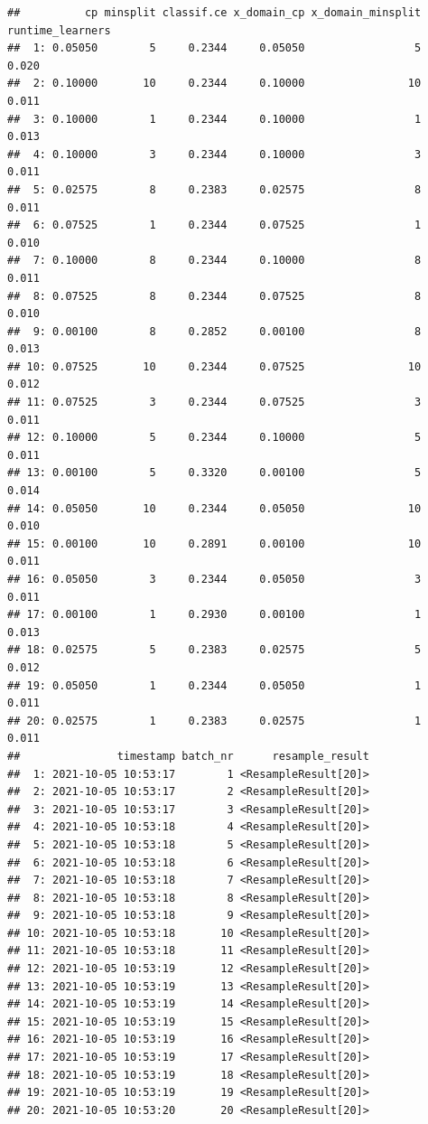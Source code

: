 \documentclass[
]{scrbook}
\begin{document}
\begin{verbatim}
##          cp minsplit classif.ce x_domain_cp x_domain_minsplit runtime_learners
##  1: 0.05050        5     0.2344     0.05050                 5            0.020
##  2: 0.10000       10     0.2344     0.10000                10            0.011
##  3: 0.10000        1     0.2344     0.10000                 1            0.013
##  4: 0.10000        3     0.2344     0.10000                 3            0.011
##  5: 0.02575        8     0.2383     0.02575                 8            0.011
##  6: 0.07525        1     0.2344     0.07525                 1            0.010
##  7: 0.10000        8     0.2344     0.10000                 8            0.011
##  8: 0.07525        8     0.2344     0.07525                 8            0.010
##  9: 0.00100        8     0.2852     0.00100                 8            0.013
## 10: 0.07525       10     0.2344     0.07525                10            0.012
## 11: 0.07525        3     0.2344     0.07525                 3            0.011
## 12: 0.10000        5     0.2344     0.10000                 5            0.011
## 13: 0.00100        5     0.3320     0.00100                 5            0.014
## 14: 0.05050       10     0.2344     0.05050                10            0.010
## 15: 0.00100       10     0.2891     0.00100                10            0.011
## 16: 0.05050        3     0.2344     0.05050                 3            0.011
## 17: 0.00100        1     0.2930     0.00100                 1            0.013
## 18: 0.02575        5     0.2383     0.02575                 5            0.012
## 19: 0.05050        1     0.2344     0.05050                 1            0.011
## 20: 0.02575        1     0.2383     0.02575                 1            0.011
##               timestamp batch_nr      resample_result
##  1: 2021-10-05 10:53:17        1 <ResampleResult[20]>
##  2: 2021-10-05 10:53:17        2 <ResampleResult[20]>
##  3: 2021-10-05 10:53:17        3 <ResampleResult[20]>
##  4: 2021-10-05 10:53:18        4 <ResampleResult[20]>
##  5: 2021-10-05 10:53:18        5 <ResampleResult[20]>
##  6: 2021-10-05 10:53:18        6 <ResampleResult[20]>
##  7: 2021-10-05 10:53:18        7 <ResampleResult[20]>
##  8: 2021-10-05 10:53:18        8 <ResampleResult[20]>
##  9: 2021-10-05 10:53:18        9 <ResampleResult[20]>
## 10: 2021-10-05 10:53:18       10 <ResampleResult[20]>
## 11: 2021-10-05 10:53:18       11 <ResampleResult[20]>
## 12: 2021-10-05 10:53:19       12 <ResampleResult[20]>
## 13: 2021-10-05 10:53:19       13 <ResampleResult[20]>
## 14: 2021-10-05 10:53:19       14 <ResampleResult[20]>
## 15: 2021-10-05 10:53:19       15 <ResampleResult[20]>
## 16: 2021-10-05 10:53:19       16 <ResampleResult[20]>
## 17: 2021-10-05 10:53:19       17 <ResampleResult[20]>
## 18: 2021-10-05 10:53:19       18 <ResampleResult[20]>
## 19: 2021-10-05 10:53:19       19 <ResampleResult[20]>
## 20: 2021-10-05 10:53:20       20 <ResampleResult[20]>
\end{verbatim}
\end{document}
